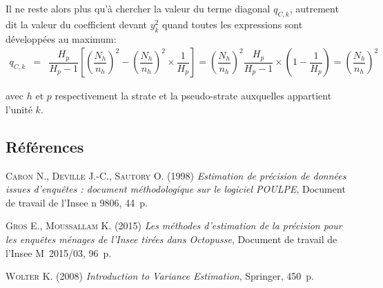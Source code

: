 \documentclass[a4paper,12pt]{article}
\begin{document}
\bigskip Il ne reste alors plus qu'à chercher la valeur du terme diagonal $q_{C,k}$, autrement dit la valeur du coefficient devant $y_k^2$ quand toutes les expressions sont développées au maximum:
\begin{eqnarray*}
q_{C,k} &=& \dfrac{H_p}{H_p - 1} \left[\left(\dfrac{N_h}{n_h}\right)^2 - \left(\dfrac{N_h}{n_h}\right)^2 \times \dfrac{1}{H_p}\right] = \left(\dfrac{N_h}{n_h}\right)^2 \dfrac{H_p}{H_p - 1} \times \left(1 - \dfrac{1}{H_p}\right) = \left(\dfrac{N_h}{n_h}\right)^2
\end{eqnarray*}

avec $h$ et $p$ respectivement la strate et la pseudo-strate auxquelles appartient l'unité $k$.

\bigskip \subsection*{Références}

\bigskip \textsc{Caron N., Deville J.-C., Sautory O.} (1998) \textit{Estimation de précision de données issues d'enquêtes : document méthodologique sur le logiciel POULPE}, Document de travail de l'Insee n 9806, 44~p.

\bigskip \textsc{Gros E., Moussallam K.} (2015) \textit{Les méthodes d'estimation de la précision pour les enquêtes ménages de l'Insee tirées dans Octopusse}, Document de travail de l'Insee M~2015/03, 96~p.

\bigskip \textsc{Wolter K.} (2008) \textit{Introduction to Variance Estimation}, Springer, 450~p.
\end{document}
